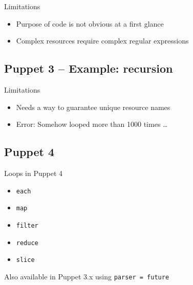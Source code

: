 \documentclass[english,aspectratio=43,nohandout]{beamer}
\begin{document}
\begin{frame}{\insertsection}{\insertsubsection}


\vspace{\baselineskip}\pause

Limitations
\begin{itemize}
\item Purpose of code is not obvious at a first glance
\item Complex resources require complex regular expressions
\end{itemize}
\end{frame}

\subsection{Puppet 3 -- Example: recursion}

\begin{frame}{\insertsection}{\insertsubsection}


\vspace{\baselineskip}\pause

Limitations
\begin{itemize}
\item Needs a way to guarantee unique resource names
\item Error: Somehow looped more than 1000 times \dots
\end{itemize}
\end{frame}

\subsection{Puppet 4}

\begin{frame}{\insertsection}{\insertsubsection}
Loops in Puppet 4\pause
\begin{itemize}
\item \texttt{each}
\item \texttt{map}
\item \texttt{filter}
\item \texttt{reduce}
\item \texttt{slice}
\end{itemize}

\vspace{\baselineskip}\pause

Also available in Puppet 3.x using \lstinline{parser = future}
\end{frame}
\end{document}
